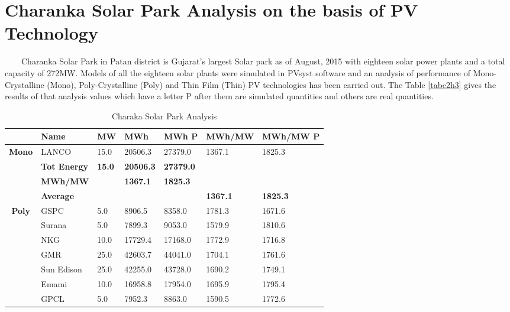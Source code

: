 \section{Charanka Solar Park Analysis on the basis of PV Technology}
\
\
\
\
Charanka Solar Park in Patan district is Gujarat's largest Solar park as of August, 2015 with eighteen solar power plants and a total capacity of 272MW. Models of all the eighteen solar plants were simulated in PVsyst software and an analysis of performance of Mono-Crystalline (Mono), Poly-Crystalline (Poly) and Thin Film (Thin) PV technologies has been carried out. The Table \ref{tabc2h3} gives the results of that analysis values which have a letter P after them are simulated quantities and others are real quantities.
\\
\begin{table}[H]
  \centering
  \caption{Charaka Solar Park Analysis}
    \begin{tabular}{|c|l|l|l|l|l|l|}
    \hline
    \textbf{} & \textbf{Name} & \textbf{MW} & \textbf{MWh} & {\textbf{MWh P}} & \textbf{MWh/MW} & \textbf{MWh/MW P} \bigstrut\\
    \hline
    \textbf{Mono} & LANCO  & 15.0 & 20506.3 & 27379.0 & 1367.1 & 1825.3 \bigstrut\\
\cline{2-7}       & \textbf{Tot Energy} & \textbf{15.0} & \textbf{20506.3} & \textbf{27379.0} &    &  \bigstrut\\
\cline{2-7}       & \textbf{MWh/MW} &    & \textbf{1367.1} & \textbf{1825.3} &    &  \bigstrut\\
\cline{2-7}       & \textbf{Average} &    &    &    & \textbf{1367.1} & \textbf{1825.3} \bigstrut\\
    \hline
    \textbf{Poly } & GSPC  & 5.0 & 8906.5 & 8358.0 & 1781.3 & 1671.6 \bigstrut\\
\cline{2-7}       & Surana  & 5.0 & 7899.3 & 9053.0 & 1579.9 & 1810.6 \bigstrut\\
\cline{2-7}       & NKG  & 10.0 & 17729.4 & 17168.0 & 1772.9 & 1716.8 \bigstrut\\
\cline{2-7}       & GMR  & 25.0 & 42603.7 & 44041.0 & 1704.1 & 1761.6 \bigstrut\\
\cline{2-7}       & Sun Edison & 25.0 & 42255.0 & 43728.0 & 1690.2 & 1749.1 \bigstrut\\
\cline{2-7}       & Emami  & 10.0 & 16958.8 & 17954.0 & 1695.9 & 1795.4 \bigstrut\\
\cline{2-7}       & GPCL & 5.0 & 7952.3 & 8863.0 & 1590.5 & 1772.6 \bigstrut\\

\end{tabular}
\end{table}
